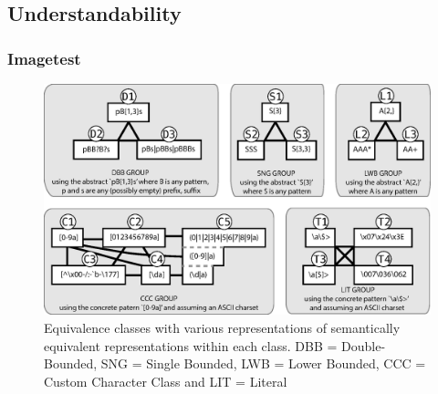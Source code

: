 \subsection{Understandability}



\begin{frame}
\frametitle{Imagetest}
\begin{figure}[h]
  \centering
  \includegraphics[scale=0.4]{nontex/illustrations/refactoringTree.eps}
  \caption{Equivalence classes with various representations of semantically equivalent representations within each class. DBB = Double-Bounded, SNG = Single Bounded, LWB = Lower Bounded, CCC = Custom Character Class and LIT = Literal}
  \label{fig:refactoringTree}
\end{figure}
\end{frame}

